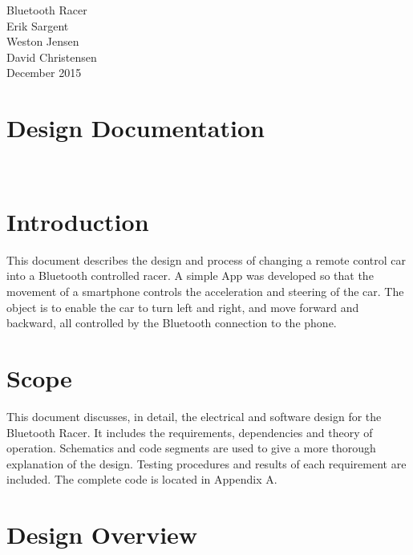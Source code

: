 \documentclass[12pt]{article}
\begin{document}
\begin{titlepage}
\begin {center}
\Huge Bluetooth Racer\\


\Large Erik Sargent\\
\Large Weston Jensen\\
\Large David Christensen\\
December 2015\\
\end {center}

\end{titlepage}


\tableofcontents
\listoffigures
\listoftables
\newpage

\section{Design Documentation}

\

\section{Introduction}

This document describes the design and process of changing a remote control car into a Bluetooth controlled racer. A simple App was developed so that the movement of a smartphone controls the acceleration and steering of the car. The object is to enable the car to turn left and right, and move forward and backward, all controlled by the Bluetooth connection to the phone.\\

\section{Scope}
This document discusses, in detail, the electrical and software design for the Bluetooth Racer. It includes the requirements, dependencies and theory of operation. Schematics and code segments are used to give a more thorough explanation of the design. Testing procedures and results of each requirement are included. The complete code is located in Appendix A.\\

\section{Design Overview}
\end{document}
